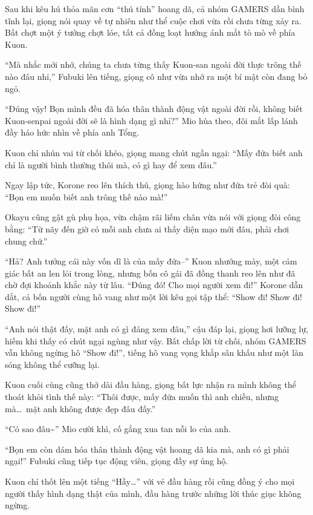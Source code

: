 \documentclass[../main.tex]{subfiles}
\begin{document}
Sau khi kêu hú thỏa mãn cơn ``thú tính'' hoang dã, cả nhóm GAMERS dần bình tĩnh lại, giọng nói quay về tự nhiên như thể cuộc chơi vừa rồi chưa từng xảy ra. Bất chợt một ý tưởng chợt lóe, tất cả đồng loạt hướng ánh mắt tò mò về phía Kuon.

``Mà nhắc mới nhớ, chúng ta chưa từng thấy Kuon-san ngoài đời thực trông thế nào đâu nhỉ,'' Fubuki lên tiếng, giọng cô như vừa nhớ ra một bí mật còn đang bỏ ngỏ.

``Đúng vậy! Bọn mình đều đã hóa thân thành động vật ngoài đời rồi, không biết Kuon-senpai ngoài đời sẽ là hình dạng gì nhỉ?'' Mio hùa theo, đôi mắt lấp lánh đầy háo hức nhìn về phía anh Tổng.

Kuon chỉ nhún vai từ chối khéo, giọng mang chút ngần ngại: ``Mấy đứa biết anh chỉ là người bình thường thôi mà, có gì hay để xem đâu.''

Ngay lập tức, Korone reo lên thích thú, giọng hào hứng như đứa trẻ đòi quà: ``Bọn em muốn biết anh trông thế nào mà!''

Okayu cũng gật gù phụ họa, vừa chậm rãi liếm chân vừa nói với giọng đòi công bằng: ``Từ nãy đến giờ có mỗi anh chưa ai thấy diện mạo mới đâu, phải chơi chung chứ.''

``Hả? Anh tưởng cái này vốn dĩ là của mấy đứa--'' Kuon nhướng mày, một cảm giác bất an len lỏi trong lòng, nhưng bốn cô gái đã đồng thanh reo lên như đã chờ đợi khoảnh khắc này từ lâu. ``Đúng đó! Cho mọi người xem đi!'' Korone dẫn dắt, cả bốn người cùng hô vang như một lời kêu gọi tập thể: ``Show đi! Show đi! Show đi!''

``Anh nói thật đấy, mặt anh có gì đáng xem đâu,'' cậu đáp lại, giọng hơi lưỡng lự, hiếm khi thấy có chút ngại ngùng như vậy. Bất chấp lời từ chối, nhóm GAMERS vẫn không ngừng hô ``Show đi!'', tiếng hô vang vọng khắp sân khấu như một làn sóng không thể cưỡng lại.

Kuon cuối cùng cũng thở dài đầu hàng, giọng bất lực nhận ra mình không thể thoát khỏi tình thế này: ``Thôi được, mấy đứa muốn thì anh chiều, nhưng mà\dots\ mặt anh không được đẹp đâu đấy.''

``Có sao đâu\~{}'' Mio cười khì, cố gắng xua tan nỗi lo của anh.

``Bọn em còn dám hóa thân thành động vật hoang dã kia mà, anh có gì phải ngại!'' Fubuki cũng tiếp tục động viên, giọng đầy sự ủng hộ.

Kuon chỉ thốt lên một tiếng ``Hầy\dots'' với vẻ đầu hàng rồi cũng đồng ý cho mọi người thấy hình dạng thật của mình, đầu hàng trước những lời thúc giục không ngừng.
\end{document}
